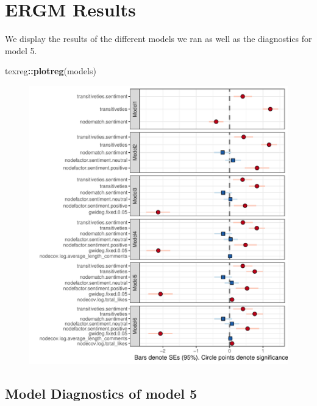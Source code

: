 \documentclass[
  man,floatsintext]{apa6}
\newenvironment{Shaded}{\begin{snugshade}}{\end{snugshade}}
\newcommand{\FunctionTok}[1]{\textcolor[rgb]{0.13,0.29,0.53}{\textbf{#1}}}
\newcommand{\NormalTok}[1]{#1}
\newcommand{\SpecialCharTok}[1]{\textcolor[rgb]{0.81,0.36,0.00}{\textbf{#1}}}
\begin{document}
\section{\texorpdfstring{ERGM Results\\
}{ERGM Results }}\label{ergm-results}

We display the results of the different models we ran as well as the diagnostics for model 5.\\


\begin{Shaded}
\begin{Highlighting}[]
\NormalTok{texreg}\SpecialCharTok{::}\FunctionTok{plotreg}\NormalTok{(models)}
\end{Highlighting}
\end{Shaded}

\begin{figure}[H]
\includegraphics{SNA4DS_Report_files/figure-latex/ergm-results-plot-1} \caption{ }\label{fig:ergm-results-plot}
\end{figure}
\newpage

\subsection{\texorpdfstring{Model Diagnostics of model 5\\
}{Model Diagnostics of model 5 }}\label{model-diagnostics-of-model-5}
\end{document}
